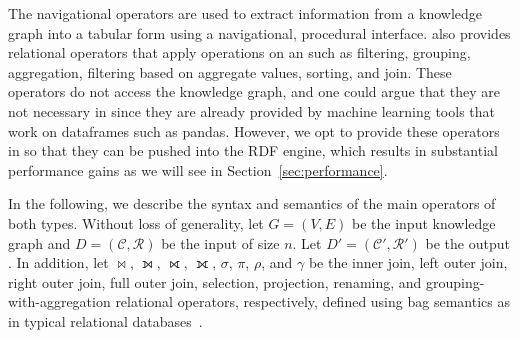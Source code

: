 The \rdfframes navigational operators are used to extract information from a knowledge graph into a tabular form using a navigational, procedural interface.
\rdfframes also provides relational operators that
apply operations on an \rdfframe such as filtering,
grouping, aggregation, filtering based on aggregate values, sorting, and join.
These operators do not access the knowledge graph, and one could argue that they are not necessary in \rdfframes since they are already provided by machine learning tools that work on dataframes such as pandas.
However, 
we opt to provide these operators
in \rdfframes 
so that they can be pushed into the RDF engine, which results in substantial performance gains as we will see in Section~\ref{sec:performance}.

In the following, we describe the syntax and semantics of the main operators of both types.
Without loss of generality, let $G=(V, E)$ be the input knowledge graph and $D=(\mathcal{C}, \mathcal{R})$ be the input \rdfframe of size $n$.
Let $D'=(\mathcal{C'}, \mathcal{R'})$ be the output \rdfframe.
In addition, let $\Join$, $\leftouterjoin$, $\rightouterjoin$, $\fullouterjoin$, $\sigma$, $\pi$, $\rho$, and $\gamma$ be the inner join, left outer join, right outer join, full outer join, selection, projection, renaming, and grouping-with-aggregation relational operators, respectively, defined using bag semantics as in typical relational databases~\cite{dbcomplete}.

